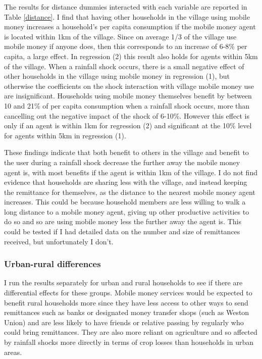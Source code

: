 The results for distance dummies interacted with each variable are reported in Table \ref{distance}. I find that having other households in the village using mobile money increases a household's per capita consumption if the mobile money agent is located within 1km of the village. Since on average 1/3 of the village use mobile money if anyone does, then this corresponds to an increase of 6-8\% per capita, a large effect. In regression (2) this result also holds for agents within 5km of the village. When a rainfall shock occurs, there is a small negative effect of other households in the village using mobile money in regression (1), but otherwise the coefficients on the shock interaction with village mobile money use are insignificant. Households using mobile money themselves benefit by between 10 and 21\% of per capita consumption when a rainfall shock occurs, more than cancelling out the negative impact of the shock of 6-10\%. However this effect is only if an agent is within 1km for regression (2) and significant at the 10\% level for agents within 5km in regression (1). 

These findings indicate that both benefit to others in the village and benefit to the user during a rainfall shock decrease the further away the mobile money agent is, with most benefits if the agent is within 1km of the village. I do not find evidence that households are sharing less with the village, and instead keeping the remittance for themselves, as the distance to the nearest mobile money agent increases. This could be because household members are less willing to walk a long distance to a mobile money agent, giving up other productive activities to do so and so are using mobile money less the further away the agent is. This could be tested if I had detailed data on the number and size of remittances received, but unfortunately I don't.   



\subsubsection{Urban-rural differences}
I run the results separately for urban and rural households to see if there are differential effects for these groups. Mobile money services would be expected to benefit rural households more since they have less access to other ways to send remittances such as banks or designated money transfer shops (such as Weston Union) and are less likely to have friends or relative passing by regularly who could bring remittances. They are also more reliant on agriculture and so affected by rainfall shocks more directly in terms of crop losses than households in urban areas. 

